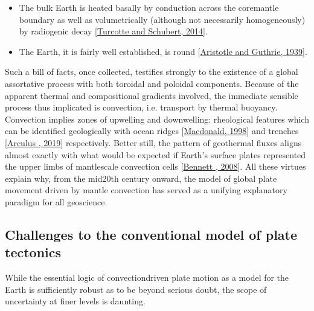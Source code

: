 \documentclass[letterpaper,10pt,english]{jupyterBook}
\begin{document}
\begin{itemize}
\item {} 
\sphinxAtStartPar
The bulk Earth is heated basally by conduction across the core\sphinxhyphen{}mantle boundary as well as volumetrically (although not necessarily homogeneously) by radiogenic decay {[}\hyperlink{cite.references:id664}{Turcotte and Schubert, 2014}{]}.

\item {} 
\sphinxAtStartPar
The Earth, it is fairly well established, is round {[}\hyperlink{cite.references:id501}{Aristotle and Guthrie, 1939}{]}.

\end{itemize}

\sphinxAtStartPar
Such a bill of facts, once collected, testifies strongly to the existence of a global assortative process with both toroidal and poloidal components. Because of the apparent thermal and compositional gradients involved, the immediate sensible process thus implicated is convection, i.e. transport by thermal buoyancy. Convection implies zones of upwelling and downwelling: rheological features which can be identified geologically with ocean ridges {[}\hyperlink{cite.references:id508}{Macdonald, 1998}{]} and trenches {[}\hyperlink{cite.references:id509}{Arculus , 2019}{]} respectively. Better still, the pattern of geothermal fluxes aligns almost exactly with what would be expected if Earth’s surface plates represented the upper limbs of mantle\sphinxhyphen{}scale convection cells {[}\hyperlink{cite.references:id510}{Bennett , 2008}{]}. All these virtues explain why, from the mid\sphinxhyphen{}20th century onward, the model of global plate movement driven by mantle convection has served as a unifying explanatory paradigm for all geoscience.


\subsection{Challenges to the conventional model of plate tectonics}
\label{\detokenize{content/chapter_01_background/main:challenges-to-the-conventional-model-of-plate-tectonics}}
\sphinxAtStartPar
While the essential logic of convection\sphinxhyphen{}driven plate motion as a model for the Earth is sufficiently robust as to be beyond serious doubt, the scope of uncertainty at finer levels is daunting.
\end{document}
